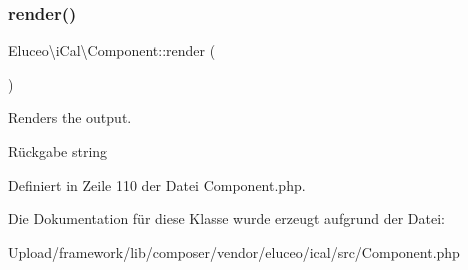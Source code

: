 \mbox{\label{class_eluceo_1_1i_cal_1_1_component_a66f0174f6e8d985c704378470f326aff}} 
\subsubsection{\texorpdfstring{render()}{render()}\hspace{0.1cm}{\footnotesize\ttfamily [3/3]}}
{\footnotesize\ttfamily Eluceo\textbackslash{}i\+Cal\textbackslash{}\+Component\+::render (\begin{DoxyParamCaption}{ }\end{DoxyParamCaption})}

Renders the output.

\begin{DoxyReturn}{Rückgabe}
string 
\end{DoxyReturn}


Definiert in Zeile 110 der Datei Component.\+php.



Die Dokumentation für diese Klasse wurde erzeugt aufgrund der Datei\+:\begin{DoxyCompactItemize}
\item 
Upload/framework/lib/composer/vendor/eluceo/ical/src/Component.\+php\end{DoxyCompactItemize}
